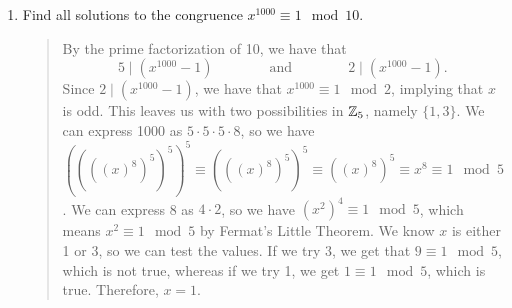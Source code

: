 \documentclass{hw}
\begin{document}
\begin{enumerate}
\item Find all solutions to the congruence $x^{1000}\equiv1\mod10$.
\begin{quote}
By the prime factorization of 10, we have that
\[
5\mid(x^{1000}-1)\qquad\qquad\text{and}\qquad\qquad2\mid(x^{1000}-1).
\]
Since $2\mid(x^{1000}-1)$, we have that $x^{1000}\equiv1\mod2$, implying that $x$ is odd. This leaves
us with two possibilities in $\mathbb{Z}_{5}$, namely $\{1,3\}$. We can express 1000 as $5\cdot5\cdot5\cdot8$,
so we have
$((((x)^{8})^{5})^{5})^{5}\equiv(((x)^{8})^{5})^{5}\equiv((x)^{8})^{5}\equiv x^{8}\equiv1\mod5$.
We can express 8 as $4\cdot2$, so we have $(x^{2})^{4}\equiv1\mod5$, which means $x^{2}\equiv1\mod5$
by Fermat's Little Theorem. We know $x$ is either 1 or 3, so we can test the values. If we try 3, we
get that $9\equiv1\mod5$, which is not true, whereas if we try 1, we get $1\equiv1\mod5$, which is true.
Therefore, $x=1$.
\end{quote}
\end{enumerate}
\end{document}
